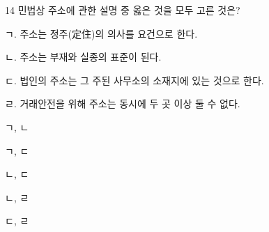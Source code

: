 \begin{question}{14}
민법상 주소에 관한 설명 중 옳은 것을 모두 고른 것은?
\begin{framedtext}
ㄱ. 주소는 정주(定住)의 의사를 요건으로 한다. \par
ㄴ. 주소는 부재와 실종의 표준이 된다. \par
ㄷ. 법인의 주소는 그 주된 사무소의 소재지에 있는 것으로 한다. \par
ㄹ. 거래안전을 위해 주소는 동시에 두 곳 이상 둘 수 없다. \par
\end{framedtext}
\begin{choices}
  \item ㄱ, ㄴ
  \item ㄱ, ㄷ
  \item ㄴ, ㄷ
  \item ㄴ, ㄹ
  \item ㄷ, ㄹ
\end{choices}
\end{question}
